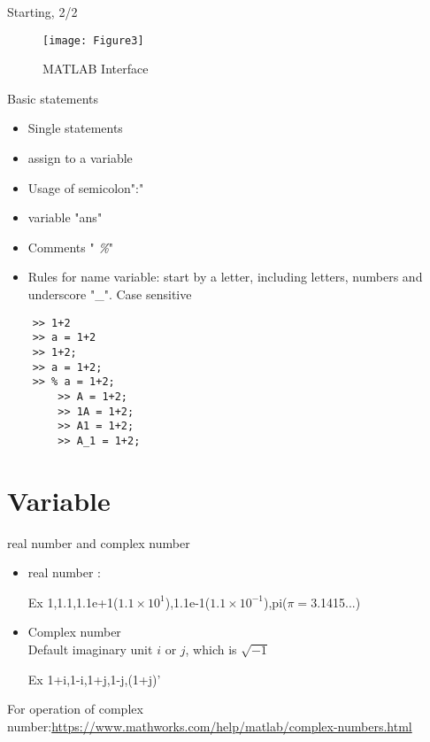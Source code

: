 \documentclass[aspectratio=169]{beamer}
\begin{document}
\begin{frame}[containsverbatim]{Starting, 2/2}

\begin{figure}
	\centering
	\texttt{[image: Figure3]}
	\caption{MATLAB Interface}
	\label{fig:figure3}
\end{figure}
\end{frame}




\begin{frame}[containsverbatim]{Basic statements}

  \begin{itemize}
    \item Single statements
    \item assign to a variable
    \item Usage of semicolon"{\color{blue}:}"
    \item variable "{\color{blue}ans}"
    \item Comments "{\color{blue} \emph\%}"
    \item Rules for name variable: start by a letter, including letters, numbers and underscore "\_". Case sensitive
  \end{itemize}
  \begin{lstlisting}
 	>> 1+2
	>> a = 1+2
	>> 1+2;
	>> a = 1+2;
	>> % a = 1+2;
        >> A = 1+2;
        >> 1A = 1+2;
        >> A1 = 1+2;
        >> A_1 = 1+2;
  \end{lstlisting}
\end{frame}
\section{Variable}
\begin{frame}{real number and complex number}
\begin{itemize}
  \item real number :
        \begin{exampleblock}{Ex}
          1,1.1,1.1e+1($1.1\times 10^{1}$),1.1e-1($1.1\times 10^{-1}$),pi($\pi=$3.1415...)\\
        \end{exampleblock}
  \item Complex number\\
        Default imaginary unit $i$ or $j$, which is $\sqrt{-1}$
        \begin{exampleblock}{Ex}
          1+i,1-i,1+j,1-j,(1+j)'
        \end{exampleblock}
\end{itemize}
 For operation of complex number:{\tiny \url{https://www.mathworks.com/help/matlab/complex-numbers.html}}
\end{frame}
\end{document}
